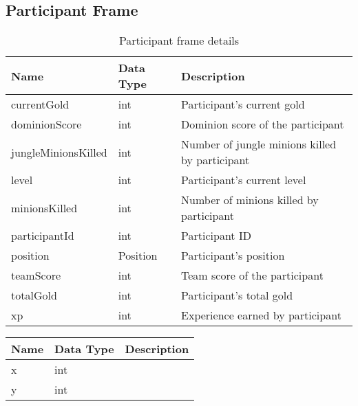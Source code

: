 \subsection{Participant Frame}
\begin{table}[!htb]
\footnotesize
\centering
\begin{tabular}{|llp{5cm}|}
\hline
\textbf{Name}       & \textbf{Data Type} & \textbf{Description}                           \\ \hline
currentGold         & int                & Participant's current gold                     \\ \hline
dominionScore       & int                & Dominion score of the participant              \\ \hline
jungleMinionsKilled & int                & Number of jungle minions killed by participant \\ \hline
level               & int                & Participant's current level                    \\ \hline
minionsKilled       & int                & Number of minions killed by participant        \\ \hline
participantId       & int                & Participant ID                                 \\ \hline
position            & Position           & Participant's position                         \\ \hline
teamScore           & int                & Team score of the participant                  \\ \hline
totalGold           & int                & Participant's total gold                       \\ \hline
xp                  & int                & Experience earned by participant               \\ \hline
\end{tabular}
\caption{Participant frame details}\label{tab:part-frame}
\end{table}

\FloatBarrier
\begin{table}[!h]
\footnotesize
\centering
\begin{tabular}{llp{5cm}}
\textbf{Name} & \textbf{Data Type} & \textbf{Description} \\ \hline
x             & int                &                      \\ \hline
y             & int                &                      \\ \hline
\end{tabular}
\end{table}

